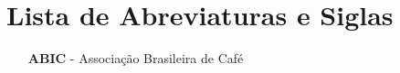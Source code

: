 \chapter*{Lista de Abreviaturas e Siglas}
\begin{itemize}
\item[\textbf{ABIC}] - Associação Brasileira de Café
\end{itemize}